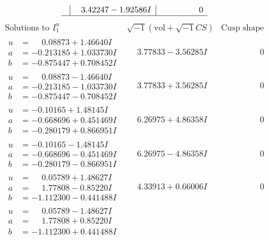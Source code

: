 \documentclass[1p]{elsarticle_modified}
\theoremstyle{definition}
\newcommand{\I}{\sqrt{-1}}
\begin{document}
$$\begin{array}{c|c|c}
 & \phantom{-}3.42247 - 1.92586 I & \phantom{-0.000000 } 0\\
 \hline 
 \end{array}$$\newpage$$\begin{array}{c|c|c}  
\text{Solutions to }I^u_{1}& \I (\text{vol} + \sqrt{-1}CS) & \text{Cusp shape}\\
 \hline 
\begin{aligned}
u &= \phantom{-}0.08873 + 1.46640 I \\
a &= -0.213185 + 1.033730 I \\
b &= -0.875447 + 0.708452 I\end{aligned}
 & \phantom{-}3.77833 - 3.56285 I & \phantom{-0.000000 } 0 \\ \hline\begin{aligned}
u &= \phantom{-}0.08873 - 1.46640 I \\
a &= -0.213185 - 1.033730 I \\
b &= -0.875447 - 0.708452 I\end{aligned}
 & \phantom{-}3.77833 + 3.56285 I & \phantom{-0.000000 } 0 \\ \hline\begin{aligned}
u &= -0.10165 + 1.48145 I \\
a &= -0.668696 + 0.451469 I \\
b &= -0.280179 + 0.866951 I\end{aligned}
 & \phantom{-}6.26975 + 4.86358 I & \phantom{-0.000000 } 0 \\ \hline\begin{aligned}
u &= -0.10165 - 1.48145 I \\
a &= -0.668696 - 0.451469 I \\
b &= -0.280179 - 0.866951 I\end{aligned}
 & \phantom{-}6.26975 - 4.86358 I & \phantom{-0.000000 } 0 \\ \hline\begin{aligned}
u &= \phantom{-}0.05789 + 1.48627 I \\
a &= \phantom{-}1.77808 - 0.85220 I \\
b &= -1.112300 - 0.441488 I\end{aligned}
 & \phantom{-}4.33913 + 0.66006 I & \phantom{-0.000000 } 0 \\ \hline\begin{aligned}
u &= \phantom{-}0.05789 - 1.48627 I \\
a &= \phantom{-}1.77808 + 0.85220 I \\
b &= -1.112300 + 0.441488 I\end{aligned}

\end{array}$$
\end{document}
